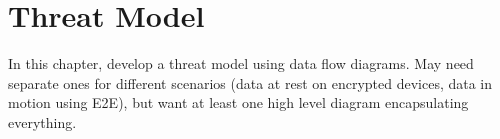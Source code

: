 \chapter{Threat Model}
\label{chap-threatmodel}

In this chapter, develop a threat model using data flow diagrams. May need separate ones for different scenarios (data
at rest on encrypted devices, data in motion using E2E), but want at least one high level diagram encapsulating
everything.
